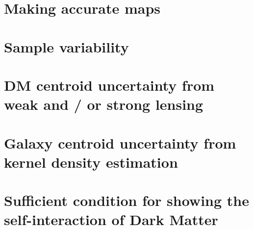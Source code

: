 \section{Making accurate maps}

\section{Sample variability} 

\section{DM centroid uncertainty from weak and / or strong lensing}

\section{Galaxy centroid uncertainty from kernel density estimation}

\section{Sufficient condition for showing the self-interaction of Dark Matter}
